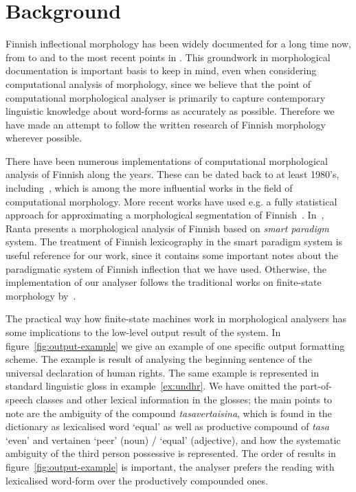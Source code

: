 \documentclass[a4paper,12pt]{article}
\begin{document}
\section{Background}
\label{sec:background}

Finnish inflectional morphology has been widely documented for a long time now,
from \citet{setala1920suomen} to \citet{hakulinen1968suomen} and
\citet{karlsson1982suomen} to the most recent points in \citet{visk}. This
groundwork in morphological documentation is important basis to keep in mind,
even when considering computational analysis of morphology, since
we believe that the point of computational morphological analyser is primarily
to capture contemporary linguistic knowledge about word-forms as accurately as
possible.  Therefore we have made an attempt to follow the written research of
Finnish morphology wherever possible.

There have been numerous implementations of computational morphological
analysis of Finnish along the years. These  can be dated back to at least
1980's, including~\citet{koskenniemi1983twolevel}, which is among the more
influential works in the field of computational morphology.  More recent works
have used e.g. a fully statistical approach for approximating a morphological
segmentation of Finnish~\citep{creutz2005unsupervised}.
In~\citet{ranta2008predictable}, Ranta presents a morphological analysis of
Finnish based on \emph{smart paradigm} system. The treatment of Finnish
lexicography in the smart paradigm system is useful reference for our work,
since it contains some important notes about the paradigmatic system of Finnish
inflection that we have used.  Otherwise, the implementation of our analyser
follows the traditional works on finite-state morphology
by~\citet{koskenniemi1983twolevel,beesley2003finite}.

The practical way how finite-state machines work in morphological analysers has
some implications to the low-level output result of the system. In
figure~\ref{fig:output-example} we give an example of one specific output
formatting scheme. The example is result of analysing the beginning sentence of
the universal declaration of human rights. The same example is represented in
standard linguistic gloss in example~\ref{ex:undhr}. We have omitted the
part-of-speech classes and other lexical information in the glosses; the main
points to note are the ambiguity of the compound \emph{tasavertaisina}, which
is found in the dictionary as lexicalised word `equal' as well as productive
compound of \emph{tasa} `even' and vertainen `peer' (noun) / `equal'
(adjective), and how the systematic ambiguity of the third person possessive is
represented. The order of results in figure~\ref{fig:output-example} is
important, the analyser prefers the reading with lexicalised word-form over the
productively compounded ones.
\end{document}
